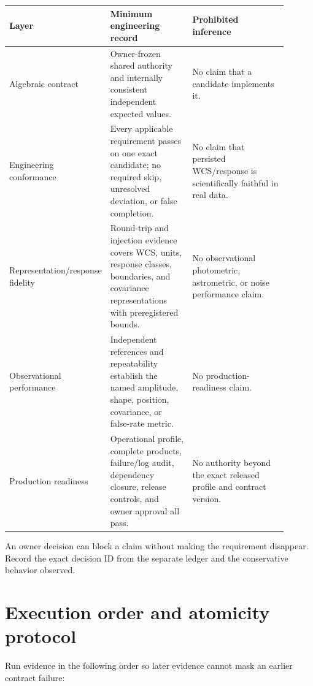 \documentclass[10pt]{article}
\begin{document}
\begin{longtable}{L{0.22\linewidth}L{0.31\linewidth}L{0.37\linewidth}}
\toprule
Layer & Minimum engineering record & Prohibited inference\\
\midrule
Algebraic contract & Owner-frozen shared authority and internally consistent
independent expected values. & No claim that a candidate implements it.\\
Engineering conformance & Every applicable requirement passes on one exact
candidate; no required skip, unresolved deviation, or false completion. & No
claim that persisted WCS/response is scientifically faithful in real data.\\
Representation/response fidelity & Round-trip and injection evidence covers
WCS, units, response classes, boundaries, and covariance representations with
preregistered bounds. & No observational photometric, astrometric, or noise
performance claim.\\
Observational performance & Independent references and repeatability establish
the named amplitude, shape, position, covariance, or false-rate metric. & No
production-readiness claim.\\
Production readiness & Operational profile, complete products, failure/log
audit, dependency closure, release controls, and owner approval all pass. & No
authority beyond the exact released profile and contract version.\\
\bottomrule
\end{longtable}

An owner decision can block a claim without making the requirement disappear.
Record the exact decision ID from the separate ledger and the conservative
behavior observed.

\section{Execution order and atomicity protocol}

Run evidence in the following order so later evidence cannot mask an earlier
contract failure:
\end{document}
